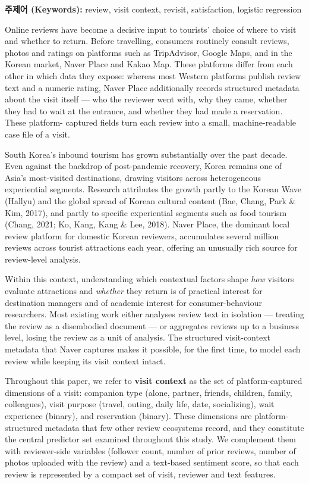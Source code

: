 \documentclass[10pt,a4paper]{article}
\newcommand{\sect}[1]{\vspace{10pt}\noindent{\Large\bfseries #1}\par\vspace{3pt}}
\newcommand{\subsect}[1]{\vspace{6pt}\noindent{\large\bfseries #1}\par\vspace{2pt}}
\begin{document}
\vspace{6pt}

\noindent\textbf{주제어 (Keywords):} review, visit context, revisit,
satisfaction, logistic regression

\sect{I. Introduction}

\subsect{1.1 Research Background}
Online reviews have become a decisive input to tourists' choice of where
to visit and whether to return. Before travelling, consumers routinely
consult reviews, photos and ratings on platforms such as TripAdvisor,
Google Maps, and in the Korean market, Naver Place and Kakao Map. These
platforms differ from each other in which data they expose: whereas most
Western platforms publish review text and a numeric rating, Naver Place
additionally records structured metadata about the visit itself --- who
the reviewer went with, why they came, whether they had to wait at the
entrance, and whether they had made a reservation. These platform-
captured fields turn each review into a small, machine-readable case
file of a visit.

South Korea's inbound tourism has grown substantially over the past
decade. Even against the backdrop of post-pandemic recovery, Korea
remains one of Asia's most-visited destinations, drawing visitors
across heterogeneous experiential segments. Research attributes the
growth partly to the Korean Wave (Hallyu) and the global spread of
Korean cultural content (Bae, Chang, Park \& Kim, 2017), and partly to
specific experiential segments such as food tourism (Chang, 2021; Ko,
Kang, Kang \& Lee, 2018). Naver Place, the dominant local review
platform for domestic Korean reviewers, accumulates several million
reviews across tourist attractions each year, offering an unusually
rich source for review-level analysis.

Within this context, understanding which contextual factors shape
\emph{how} visitors evaluate attractions and \emph{whether} they return
is of practical interest for destination managers and of academic
interest for consumer-behaviour researchers. Most existing work either
analyses review text in isolation --- treating the review as a
disembodied document --- or aggregates reviews up to a business level,
losing the review as a unit of analysis. The structured visit-context
metadata that Naver captures makes it possible, for the first time, to
model each review while keeping its visit context intact.

Throughout this paper, we refer to \textbf{visit context} as the set of
platform-captured dimensions of a visit: companion type (alone, partner,
friends, children, family, colleagues), visit purpose (travel, outing,
daily life, date, socializing), wait experience (binary), and
reservation (binary). These dimensions are platform-structured
metadata that few other review ecosystems record, and they constitute
the central predictor set examined throughout this study. We complement
them with reviewer-side variables (follower count, number of prior
reviews, number of photos uploaded with the review) and a text-based
sentiment score, so that each review is represented by a compact set of
visit, reviewer and text features.
\end{document}
